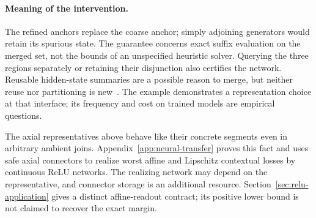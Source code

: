 \paragraph{Meaning of the intervention.}
The refined anchors replace the coarse anchor; simply adjoining generators would retain its spurious state. The guarantee concerns exact suffix evaluation on the merged set, not the bounds of an unspecified heuristic solver. Querying the three regions separately or retaining their disjunction also certifies the network. Reusable hidden-state summaries are a possible reason to merge, but neither reuse nor partitioning is new~\cite{fischer2021,singh2019}. The example demonstrates a representation choice at that interface; its frequency and cost on trained models are empirical questions.

The axial representatives above behave like their concrete segments even in arbitrary ambient joins. Appendix~\ref{app:neural-transfer} proves this fact and uses safe axial connectors to realize worst affine and Lipschitz contextual losses by continuous ReLU networks. The realizing network may depend on the representative, and connector storage is an additional resource. Section~\ref{sec:relu-application} gives a distinct affine-readout contract; its positive lower bound is not claimed to recover the exact margin.
